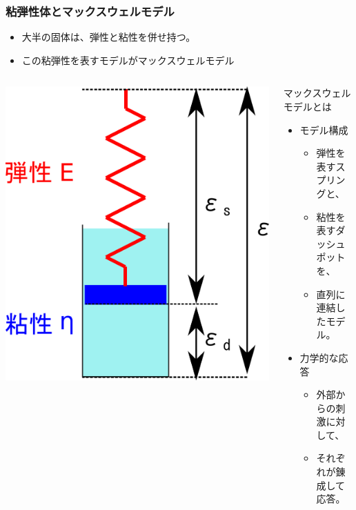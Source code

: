 \documentclass[12pt, dvipdfmx]{beamer}
\begin{document}
\begin{frame}
	\frametitle{粘弾性体とマックスウェルモデル}
	\begin{itemize}
		\item 大半の固体は、弾性と粘性を併せ持つ。
		\item この粘弾性を表すモデルがマックスウェルモデル
	\end{itemize}
	\begin{columns}[c, onlytextwidth]
		\centering
		\includegraphics[width=.9\textwidth]{Maxwell_model.png}
		\begin{block}{マックスウェルモデルとは}
			\begin{itemize}
				\item モデル構成
				\begin{itemize}
					\item 弾性を表すスプリングと、
					\item 粘性を表すダッシュポットを、
					\item 直列に連結したモデル。
				\end{itemize}
				\item 力学的な応答
				\begin{itemize}
					\item 外部からの刺激に対して、
					\item それぞれが錬成して応答。
				\end{itemize}
			\end{itemize}
			
		\end{block}
	\end{columns}
\end{frame}
\end{document}

